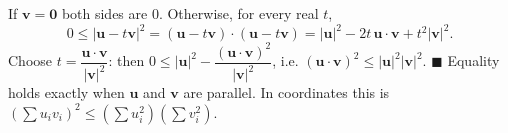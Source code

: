 If $\mathbf v=\mathbf 0$ both sides are $0$. Otherwise, for every real $t$,
\[0\le|\mathbf u-t\mathbf v|^2=(\mathbf u-t\mathbf v)\cdot(\mathbf u-t\mathbf v)=|\mathbf u|^2-2t\,\mathbf u\cdot\mathbf v+t^2|\mathbf v|^2.\]
Choose $t=\dfrac{\mathbf u\cdot\mathbf v}{|\mathbf v|^2}$: then $0\le|\mathbf u|^2-\dfrac{(\mathbf u\cdot\mathbf v)^2}{|\mathbf v|^2}$, i.e. $(\mathbf u\cdot\mathbf v)^2\le|\mathbf u|^2|\mathbf v|^2$. $\blacksquare$ Equality holds exactly when $\mathbf u$ and $\mathbf v$ are parallel. In coordinates this is $\left(\sum u_iv_i\right)^2\le\left(\sum u_i^2\right)\left(\sum v_i^2\right)$.
